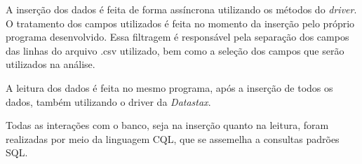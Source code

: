 A inserção dos dados é feita de forma assíncrona utilizando os métodos do \emph{driver}. O tratamento dos campos utilizados é feita no momento da inserção pelo próprio programa desenvolvido. Essa filtragem é responsável pela separação dos campos das linhas do arquivo .csv utilizado, bem como a seleção dos campos que serão utilizados na análise. 

A leitura dos dados é feita no mesmo programa, após a inserção de todos os dados, também utilizando o driver da \emph{Datastax}.

Todas as interações com o banco, seja na inserção quanto na leitura, foram realizadas por meio da linguagem CQL, que se assemelha a consultas padrões SQL.



